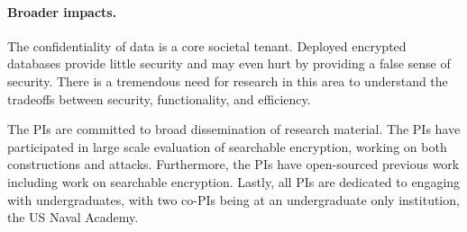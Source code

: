 \documentclass[11pt]{article}
\begin{document}
\paragraph{Broader impacts.}
The confidentiality of data is a core societal tenant.  Deployed encrypted
databases provide little security and may even hurt by providing a false sense
of security.  There is a tremendous need for research in this area to
understand the tradeoffs between security, functionality, and efficiency.

The PIs are committed to broad dissemination of research material.  The PIs
have participated in large scale evaluation of searchable encryption, working
on both constructions and attacks.  Furthermore, the PIs have open-sourced
previous work including work on searchable encryption.  Lastly, all PIs are
dedicated to engaging with undergraduates, with two co-PIs being at an
undergraduate only institution, the US Naval Academy.  
\end{document}

